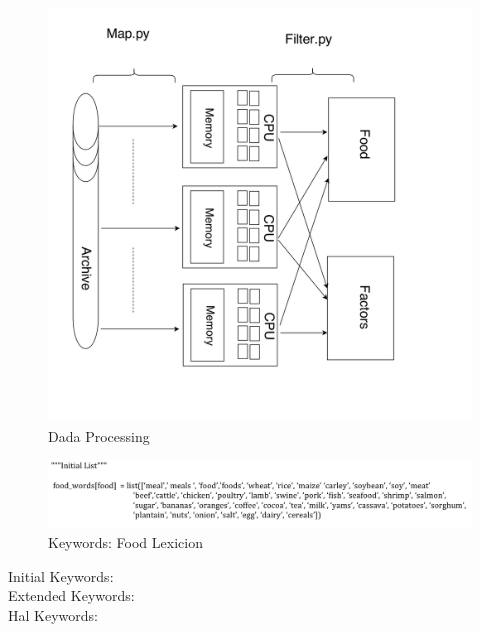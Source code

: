 \documentclass[12pt]{report}
\begin{document}
 \begin{figure}[H]
\centerline{ \noindent\includegraphics[width=1\textwidth]{img/abs/hw_model}}
 \caption{Dada Processing}
 \label{fig:dataProcessing}
\end{figure}







 \begin{figure}[H]
\centerline{ \noindent\includegraphics[width=1\textwidth]{img/abs/ini_lex}}
 \caption{Keywords: Food Lexicion}
 \label{fig:flex}
\end{figure}

 \color{red} Initial Keywords: \\
 \color{blue}Extended Keywords:  \\
\color{green}Hal Keywords:  \\
\end{document}
